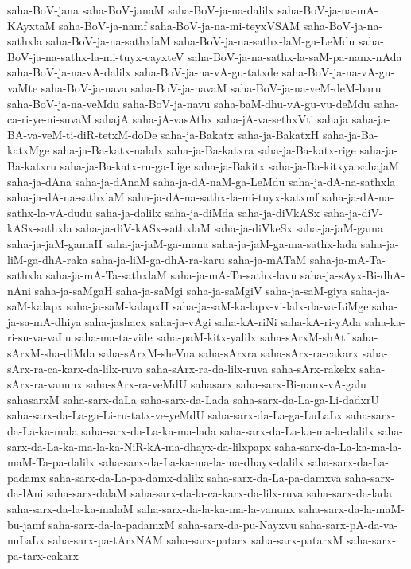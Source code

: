 {saha-BoV-jana
saha-BoV-janaM
saha-BoV-ja-na-dalilx
saha-BoV-ja-na-mA-KAyxtaM
saha-BoV-ja-namf
saha-BoV-ja-na-mi-teyxVSAM
saha-BoV-ja-na-sathxla
saha-BoV-ja-na-sathxlaM
saha-BoV-ja-na-sathx-laM-ga-LeMdu
saha-BoV-ja-na-sathx-la-mi-tuyx-cayxteV
saha-BoV-ja-na-sathx-la-saM-pa-nanx-nAda
saha-BoV-ja-na-vA-dalilx
saha-BoV-ja-na-vA-gu-tatxde
saha-BoV-ja-na-vA-gu-vaMte
saha-BoV-ja-nava
saha-BoV-ja-navaM
saha-BoV-ja-na-veM-deM-baru
saha-BoV-ja-na-veMdu
saha-BoV-ja-navu
saha-baM-dhu-vA-gu-vu-deMdu
saha-ca-ri-ye-ni-suvaM
sahajA
saha-jA-vasAthx
saha-jA-va-sethxVti
sahaja
saha-ja-BA-va-veM-ti-diR-tetxM-doDe
saha-ja-Bakatx
saha-ja-BakatxH
saha-ja-Ba-katxMge
saha-ja-Ba-katx-nalalx
saha-ja-Ba-katxra
saha-ja-Ba-katx-rige
saha-ja-Ba-katxru
saha-ja-Ba-katx-ru-ga-Lige
saha-ja-Bakitx
saha-ja-Ba-kitxya
sahajaM
saha-ja-dAna
saha-ja-dAnaM
saha-ja-dA-naM-ga-LeMdu
saha-ja-dA-na-sathxla
saha-ja-dA-na-sathxlaM
saha-ja-dA-na-sathx-la-mi-tuyx-katxmf
saha-ja-dA-na-sathx-la-vA-dudu
saha-ja-dalilx
saha-ja-diMda
saha-ja-diVkASx
saha-ja-diV-kASx-sathxla
saha-ja-diV-kASx-sathxlaM
saha-ja-diVkeSx
saha-ja-jaM-gama
saha-ja-jaM-gamaH
saha-ja-jaM-ga-mana
saha-ja-jaM-ga-ma-sathx-lada
saha-ja-liM-ga-dhA-raka
saha-ja-liM-ga-dhA-ra-karu
saha-ja-mATaM
saha-ja-mA-Ta-sathxla
saha-ja-mA-Ta-sathxlaM
saha-ja-mA-Ta-sathx-lavu
saha-ja-sAyx-Bi-dhA-nAni
saha-ja-saMgaH
saha-ja-saMgi
saha-ja-saMgiV
saha-ja-saM-giya
saha-ja-saM-kalapx
saha-ja-saM-kalapxH
saha-ja-saM-ka-lapx-vi-lalx-da-va-LiMge
saha-ja-sa-mA-dhiya
saha-jashacx
saha-ja-vAgi
saha-kA-riNi
saha-kA-ri-yAda
saha-ka-ri-su-va-vaLu
saha-ma-ta-vide
saha-paM-kitx-yalilx
saha-sArxM-shAtf
saha-sArxM-sha-diMda
saha-sArxM-sheVna
saha-sArxra
saha-sArx-ra-cakarx
saha-sArx-ra-ca-karx-da-lilx-ruva
saha-sArx-ra-da-lilx-ruva
saha-sArx-rakekx
saha-sArx-ra-vanunx
saha-sArx-ra-veMdU
sahasarx
saha-sarx-Bi-nanx-vA-galu
sahasarxM
saha-sarx-daLa
saha-sarx-da-Lada
saha-sarx-da-La-ga-Li-dadxrU
saha-sarx-da-La-ga-Li-ru-tatx-ve-yeMdU
saha-sarx-da-La-ga-LuLaLx
saha-sarx-da-La-ka-mala
saha-sarx-da-La-ka-ma-lada
saha-sarx-da-La-ka-ma-la-dalilx
saha-sarx-da-La-ka-ma-la-ka-NiR-kA-ma-dhayx-da-lilxpapx
saha-sarx-da-La-ka-ma-la-maM-Ta-pa-dalilx
saha-sarx-da-La-ka-ma-la-ma-dhayx-dalilx
saha-sarx-da-La-padamx
saha-sarx-da-La-pa-damx-dalilx
saha-sarx-da-La-pa-damxva
saha-sarx-da-lAni
saha-sarx-dalaM
saha-sarx-da-la-ca-karx-da-lilx-ruva
saha-sarx-da-lada
saha-sarx-da-la-ka-malaM
saha-sarx-da-la-ka-ma-la-vanunx
saha-sarx-da-la-maM-bu-jamf
saha-sarx-da-la-padamxM
saha-sarx-da-pu-Nayxvu
saha-sarx-pA-da-va-nuLaLx
saha-sarx-pa-tArxNAM
saha-sarx-patarx
saha-sarx-patarxM
saha-sarx-pa-tarx-cakarx
}
